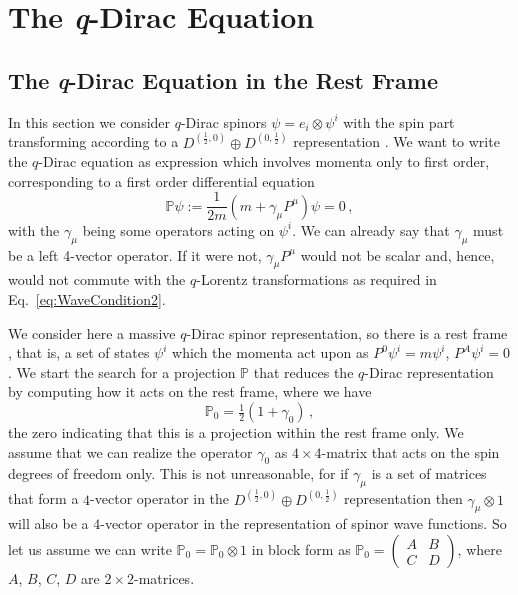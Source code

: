 \documentclass[12pt,a4paper]{article}
\newcommand{\Proj}{\mathbb{P}}
\begin{document}
\section{The \textit{q}-Dirac Equation}
\label{sec:MainContrib4b}

\subsection{The \textit{q}-Dirac Equation in the Rest Frame}

In this section we consider $q$-Dirac spinors $\psi = e_i
\otimes\psi^i$ with the spin part transforming according to a
$D^{(\frac{1}{2},0)}\oplus D^{(0,\frac{1}{2})}$ representation
\cite{Blohmann}. We want to write the $q$-Dirac equation as expression
which involves momenta only to first order, corresponding to a first
order differential equation 
\begin{equation}
  \Proj \psi := \frac{1}{2m}(m + \gamma_\mu P^\mu)\psi = 0 \,,
\end{equation}
with the $\gamma_\mu$ being some operators acting on $\psi^i$. We can
already say that $\gamma_\mu$ must be a left 4-vector operator.  If it
were not, $\gamma_\mu P^\mu$ would not be scalar and, hence, would not
commute with the $q$-Lorentz transformations as required in
Eq.~\eqref{eq:WaveCondition2}.

We consider here a massive $q$-Dirac spinor representation, so there
is a rest frame \cite{Blohmann:2001a}, that is, a set of states
$\psi^i$ which the momenta act upon as $P^0\psi^i = m \psi^i$,
$P^A\psi^i = 0$. We start the search for a projection $\Proj$ that
reduces the $q$-Dirac representation by computing how it acts on the
rest frame, where we have
\begin{equation}
  \Proj_0 = \tfrac{1}{2}(1 + \gamma_0) \,,
\end{equation}
the zero indicating that this is a projection within the rest frame
only. We assume that we can realize the operator $\gamma_0$ as
$4\times 4$-matrix that acts on the spin degrees of freedom only. This
is not unreasonable, for if $\gamma_\mu$ is a set of matrices that
form a $4$-vector operator in the $D^{(\frac{1}{2},0)}\oplus
D^{(0,\frac{1}{2})}$ representation then $\gamma_\mu \otimes 1$ will
also be a $4$-vector operator in the representation of spinor wave
functions. So let us assume we can write $\Proj_0 = \Proj_0
\otimes 1$ in block form as $\Proj_0 = (\begin{smallmatrix} A & B \\
  C & D \end{smallmatrix})$, where $A$, $B$, $C$, $D$ are $2\times
2$-matrices.
\end{document}
